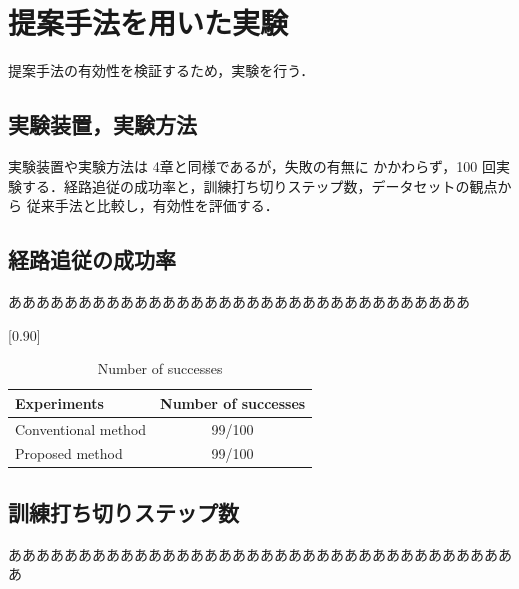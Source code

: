\documentclass{jarticle}
\begin{document}

\section{提案手法を用いた実験}
提案手法の有効性を検証するため，実験を行う．

\subsection{実験装置，実験方法}
実験装置や実験方法は 4章と同様であるが，失敗の有無に
かかわらず，100 回実験する．経路追従の成功率と，訓練打ち切りステップ数，データセットの観点から
従来手法と比較し，有効性を評価する．

\subsection{経路追従の成功率}
あああああああああああああああああああああああああああああああああ



\begin{table}[h!]
  \centering
  \caption{Number of successes}
  \label{table:2}
  \vspace*{0.5mm}
    \scalebox{0.90}[0.90] {
    \begin{tabular}{|l||c|}
      \hline
      Experiments & Number of successes \\
      \hline\hline
      Conventional method & 99/100 \\
      \hline
      Proposed method & 99/100\\
      \hline 
    \end{tabular} }
\end{table}

\subsection{訓練打ち切りステップ数}
あああああああああああああああああああああああああああああああああああああ
\end{document}
